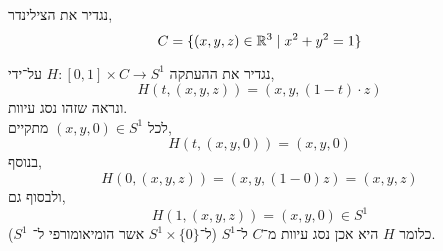 \subquestion{}
נגדיר את הצילינדר,
\[
	C
	= \{ (x, y, z) \in \mathbb{R}^3 \mid x^2 + y^2 = 1 \}
\]
\begin{solution}
	נגדיר את ההעתקה $H : [0, 1] \times C \to S^1$ על־ידי,
	\[
		H(t, (x, y, z))
		= (x, y, (1 - t) \cdot z)
	\]
	ונראה שזהו נסג עיוות. \\
	לכל $(x, y, 0) \in S^1$ מתקיים,
	\[
		H(t, (x, y, 0))
		= (x, y, 0)
	\]
	בנוסף,
	\[
		H(0, (x, y, z))
		= (x, y, (1 - 0) z)
		= (x, y, z)
	\]
	ולבסוף גם,
	\[
		H(1, (x, y, z))
		= (x, y, 0)
		\in S^1
	\]
	כלומר $H$ היא אכן נסג עיוות מ־$C$ ל־$S^1$ (ל־$S^1 \times \{ 0 \}$ אשר הומיאומורפי ל־ $S^1$).
\end{solution}



